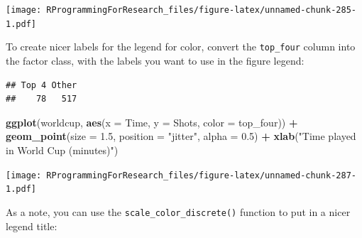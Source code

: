 \documentclass[]{book}
\makeatletter
\newenvironment{Shaded}{\begin{snugshade}}{\end{snugshade}}
\newcommand{\KeywordTok}[1]{\textcolor[rgb]{0.13,0.29,0.53}{\textbf{#1}}}
\newcommand{\DataTypeTok}[1]{\textcolor[rgb]{0.13,0.29,0.53}{#1}}
\newcommand{\FloatTok}[1]{\textcolor[rgb]{0.00,0.00,0.81}{#1}}
\newcommand{\StringTok}[1]{\textcolor[rgb]{0.31,0.60,0.02}{#1}}
\newcommand{\OtherTok}[1]{\textcolor[rgb]{0.56,0.35,0.01}{#1}}
\newcommand{\OperatorTok}[1]{\textcolor[rgb]{0.81,0.36,0.00}{\textbf{#1}}}
\newcommand{\NormalTok}[1]{#1}
\newenvironment{kframe}{%
\medskip{}
\setlength{\fboxsep}{.8em}
 \def\at@end@of@kframe{}%
 \ifinner\ifhmode%
  \def\at@end@of@kframe{\end{minipage}}%
  \begin{minipage}{\columnwidth}%
 \fi\fi%
 \def\FrameCommand##1{\hskip\@totalleftmargin \hskip-\fboxsep
 \colorbox{shadecolor}{##1}\hskip-\fboxsep
     \hskip-\linewidth \hskip-\@totalleftmargin \hskip\columnwidth}%
 \MakeFramed {\advance\hsize-\width
   \@totalleftmargin\z@ \linewidth\hsize
   \@setminipage}}%
 {\par\unskip\endMakeFramed%
 \at@end@of@kframe}
\renewenvironment{Shaded}{\begin{kframe}}{\end{kframe}}
\theoremstyle{definition}
\theoremstyle{definition}
\theoremstyle{definition}
\theoremstyle{remark}
\makeatother
\begin{document}
\texttt{[image: RProgrammingForResearch\_files/figure-latex/unnamed-chunk-285-1.pdf]}

To create nicer labels for the legend for color, convert the
\texttt{top\_four} column into the factor class, with the labels you
want to use in the figure legend:

\begin{Shaded}
\end{Shaded}

\begin{verbatim}
## Top 4 Other 
##    78   517
\end{verbatim}

\begin{Shaded}
\begin{Highlighting}[]
\KeywordTok{ggplot}\NormalTok{(worldcup, }\KeywordTok{aes}\NormalTok{(}\DataTypeTok{x =}\NormalTok{ Time, }\DataTypeTok{y =}\NormalTok{ Shots,}
                     \DataTypeTok{color =}\NormalTok{ top_four)) }\OperatorTok{+}
\StringTok{        }\KeywordTok{geom_point}\NormalTok{(}\DataTypeTok{size =} \FloatTok{1.5}\NormalTok{, }\DataTypeTok{position =} \StringTok{"jitter"}\NormalTok{,}
                   \DataTypeTok{alpha =} \FloatTok{0.5}\NormalTok{)  }\OperatorTok{+}\StringTok{ }
\StringTok{        }\KeywordTok{xlab}\NormalTok{(}\StringTok{"Time played in World Cup (minutes)"}\NormalTok{)}
\end{Highlighting}
\end{Shaded}

\texttt{[image: RProgrammingForResearch\_files/figure-latex/unnamed-chunk-287-1.pdf]}

As a note, you can use the \texttt{scale\_color\_discrete()} function to
put in a nicer legend title:
\end{document}
